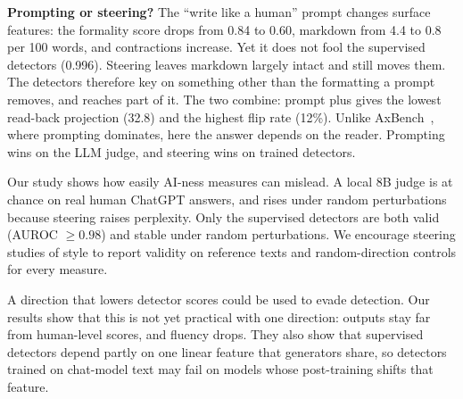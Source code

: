 {\bf Prompting or steering?} The ``write like a human'' prompt changes surface features: the formality score drops from 0.84 to 0.60, markdown from 4.4 to 0.8 per 100 words, and contractions increase. Yet it does not fool the supervised detectors (0.996). Steering leaves markdown largely intact and still moves them. The detectors therefore key on something other than the formatting a prompt removes, and \dai reaches part of it. The two combine: prompt plus \dai gives the lowest read-back projection (32.8) and the highest flip rate (12\%). Unlike AxBench~\citep{wu2025axbench}, where prompting dominates, here the answer depends on the reader. Prompting wins on the LLM judge, and steering wins on trained detectors.

 Our study shows how easily AI-ness measures can mislead. A local 8B judge is at chance on real human \versus ChatGPT answers, and \binoculars rises under random perturbations because steering raises perplexity. Only the supervised detectors are both valid (AUROC $\ge 0.98$) and stable under random perturbations. We encourage steering studies of style to report validity on reference texts and random-direction controls for every measure.

 A direction that lowers detector scores could be used to evade detection. Our results show that this is not yet practical with one direction: outputs stay far from human-level scores, and fluency drops. They also show that supervised detectors depend partly on one linear feature that generators share, so detectors trained on chat-model text may fail on models whose post-training shifts that feature.

